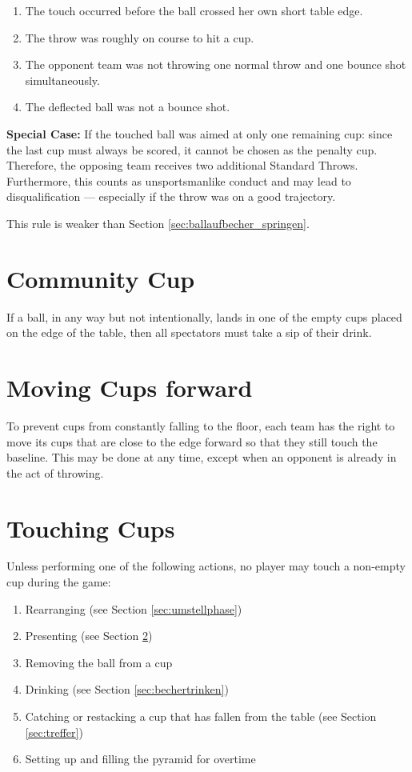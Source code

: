 \documentclass[a5paper, 12pt]{book}
\begin{document}
\begin{enumerate}
    \item The touch occurred before the ball crossed her own short table edge.
    \item The throw was roughly on course to hit a cup.
    \item The opponent team was not throwing one normal throw and one bounce shot simultaneously.
    \item The deflected ball was not a bounce shot.
\end{enumerate}

\textbf{Special Case:}  
If the touched ball was aimed at only one remaining cup:  
since the last cup must always be scored, it cannot be chosen as the penalty cup.  
Therefore, the opposing team receives two additional Standard Throws.  
Furthermore, this counts as unsportsmanlike conduct and may lead to disqualification — especially if the throw was on a good trajectory.

This rule is weaker than Section \ref{sec:ballaufbecher_springen}.

\section{Community Cup}\label{sec:communitycup}
If a ball, in any way but not intentionally, lands in one of the empty cups placed on the edge of the table, then all spectators must take a sip of their drink.

\section{Moving Cups forward}\label{sec:bechervorstellen}
To prevent cups from constantly falling to the floor, each team has the right to move its cups that are close to the edge forward so that they still touch the baseline.  
This may be done at any time, except when an opponent is already in the act of throwing.

\section{Touching Cups}\label{sec:becherberuehren}
Unless performing one of the following actions, no player may touch a non-empty cup during the game:

\begin{enumerate}
    \item Rearranging (see Section \ref{sec:umstellphase})
    \item Presenting (see Section \ref{sec:bechervorstellen})
    \item Removing the ball from a cup
    \item Drinking (see Section \ref{sec:bechertrinken})
    \item Catching or restacking a cup that has fallen from the table (see Section \ref{sec:treffer})
    \item Setting up and filling the pyramid for overtime
\end{enumerate}
\end{document}
